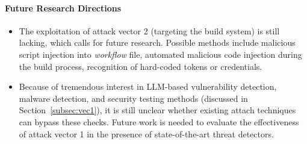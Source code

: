 \paragraph*{Future Research Directions} 
\begin{itemize}
  \item The exploitation of attack vector 2 (targeting the build system)
  is still lacking, which calls for future research. Possible methods
  include malicious script injection into \textit{workflow} file,
  automated malicious code injection during the build process,
  recognition of hard-coded tokens or credentials.

  \item Because of tremendous interest in LLM-based vulnerability
  detection, malware detection, and security testing methods (discussed 
in Section~\ref{subsec:vec1}), it is still unclear whether
existing attach techniques can bypass these checks.
 Future work is needed to evaluate the effectiveness of attack vector 1
 in the presence of state-of-the-art threat detectors.
\end{itemize}


